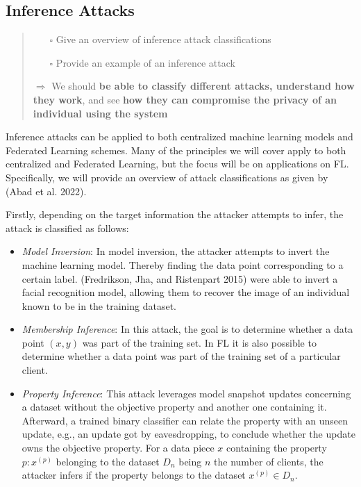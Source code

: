 \hypertarget{inference-attacks}{%
\subsection{Inference Attacks}\label{inference-attacks}}

\begin{quote}
\begin{itemize}
\tightlist
\item[$\square$]
  Give an overview of inference attack classifications
\item[$\square$]
  Provide an example of an inference attack
\end{itemize}

\(\Rightarrow\) We should \textbf{be able to classify different attacks,
understand how they work}, and see \textbf{how they can compromise the
privacy of an individual using the system}
\end{quote}

Inference attacks can be applied to both centralized machine learning
models and Federated Learning schemes. Many of the principles we will
cover apply to both centralized and Federated Learning, but the focus
will be on applications on FL. Specifically, we will provide an overview
of attack classifications as given by (Abad et al. 2022).

Firstly, depending on the target information the attacker attempts to
infer, the attack is classified as follows:

\begin{itemize}
\item
  \emph{Model Inversion}: In model inversion, the attacker attempts to
  invert the machine learning model. Thereby finding the data point
  corresponding to a certain label. (Fredrikson, Jha, and Ristenpart
  2015) were able to invert a facial recognition model, allowing them to
  recover the image of an individual known to be in the training
  dataset.
\item
  \emph{Membership Inference}: In this attack, the goal is to determine
  whether a data point \((x, y)\) was part of the training set. In FL it
  is also possible to determine whether a data point was part of the
  training set of a particular client.
\item
  \emph{Property Inference}: This attack leverages model snapshot
  updates concerning a dataset without the objective property and
  another one containing it. Afterward, a trained binary classifier can
  relate the property with an unseen update, e.g., an update got by
  eavesdropping, to conclude whether the update owns the objective
  property. For a data piece \(x\) containing the property
  \(p: x^{(p)}\) belonging to the dataset \(D_n\) being \(n\) the number
  of clients, the attacker infers if the property belongs to the dataset
  \(x^{(p)} \in D_n\).
\end{itemize}

